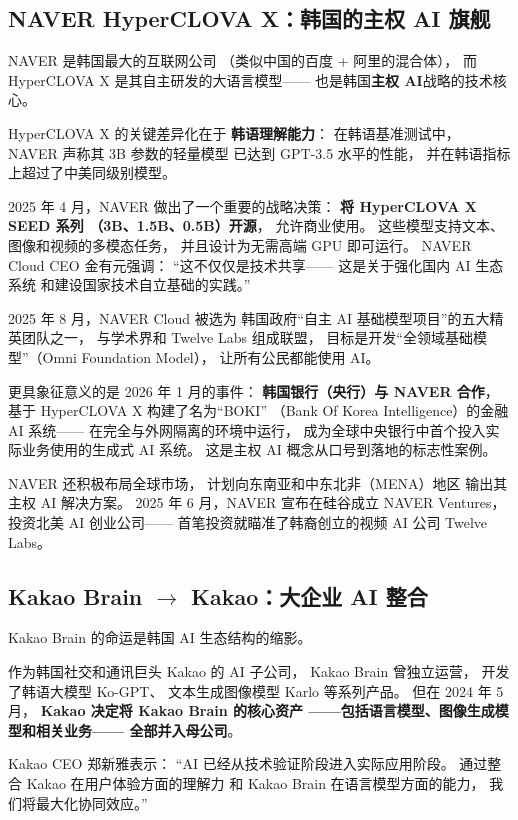 \subsection{NAVER HyperCLOVA X：韩国的主权 AI 旗舰}

NAVER 是韩国最大的互联网公司
（类似中国的百度 + 阿里的混合体），
而 HyperCLOVA X 是其自主研发的大语言模型——
也是韩国\textbf{主权 AI}战略的技术核心。

HyperCLOVA X 的关键差异化在于
\textbf{韩语理解能力}：
在韩语基准测试中，
NAVER 声称其 3B 参数的轻量模型
已达到 GPT-3.5 水平的性能，
并在韩语指标上超过了中美同级别模型。

2025 年 4 月，NAVER 做出了一个重要的战略决策：
\textbf{将 HyperCLOVA X SEED 系列
（3B、1.5B、0.5B）开源}，
允许商业使用。
这些模型支持文本、图像和视频的多模态任务，
并且设计为无需高端 GPU 即可运行。
NAVER Cloud CEO 金有元强调：
``这不仅仅是技术共享——
这是关于强化国内 AI 生态系统
和建设国家技术自立基础的实践。''

2025 年 8 月，NAVER Cloud 被选为
韩国政府``自主 AI 基础模型项目''的五大精英团队之一，
与学术界和 Twelve Labs 组成联盟，
目标是开发``全领域基础模型''（Omni Foundation Model），
让所有公民都能使用 AI。

更具象征意义的是 2026 年 1 月的事件：
\textbf{韩国银行（央行）与 NAVER 合作}，
基于 HyperCLOVA X 构建了名为``BOKI''
（Bank Of Korea Intelligence）的金融 AI 系统——
在完全与外网隔离的环境中运行，
成为全球中央银行中首个投入实际业务使用的生成式 AI 系统。
这是主权 AI 概念从口号到落地的标志性案例。

NAVER 还积极布局全球市场，
计划向东南亚和中东北非（MENA）地区
输出其主权 AI 解决方案。
2025 年 6 月，NAVER 宣布在硅谷成立 NAVER Ventures，
投资北美 AI 创业公司——
首笔投资就瞄准了韩裔创立的视频 AI 公司 Twelve Labs。

\subsection{Kakao Brain $\to$ Kakao：大企业 AI 整合}

Kakao Brain 的命运是韩国 AI 生态结构的缩影。

作为韩国社交和通讯巨头 Kakao 的 AI 子公司，
Kakao Brain 曾独立运营，
开发了韩语大模型 Ko-GPT、
文本生成图像模型 Karlo 等系列产品。
但在 2024 年 5 月，
\textbf{Kakao 决定将 Kakao Brain 的核心资产
——包括语言模型、图像生成模型和相关业务——
全部并入母公司}。

Kakao CEO 郑新雅表示：
``AI 已经从技术验证阶段进入实际应用阶段。
通过整合 Kakao 在用户体验方面的理解力
和 Kakao Brain 在语言模型方面的能力，
我们将最大化协同效应。''

